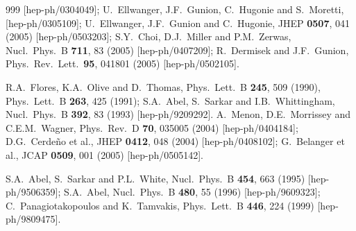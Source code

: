 \documentclass[11pt]{article}
\begin{document}
\begin{thebibliography}{999}
  [hep-ph/0304049];
U.~Ellwanger, J.F.~Gunion, C.~Hugonie and S.~Moretti,
  [hep-ph/0305109];
U.~Ellwanger, J.F.~Gunion and C.~Hugonie,
  JHEP {\bf 0507}, 041 (2005)
  [hep-ph/0503203];
S.Y.~Choi, D.J.~Miller and P.M.~Zerwas,
  Nucl.\ Phys.\ B {\bf 711}, 83 (2005)
  [hep-ph/0407209];
R.~Dermisek and J.F.~Gunion,
  Phys.\ Rev.\ Lett.\  {\bf 95}, 041801 (2005)
  [hep-ph/0502105].

R.A.~Flores, K.A.~Olive and D.~Thomas,
  Phys.\ Lett.\ B {\bf 245}, 509 (1990),
  Phys.\ Lett.\ B {\bf 263}, 425 (1991);
S.A.~Abel, S.~Sarkar and I.B.~Whittingham, 
  Nucl.\ Phys.\ B {\bf 392}, 83 (1993)
  [hep-ph/9209292].
A.~Menon, D.E.~Morrissey and C.E.M.~Wagner,
  Phys.\ Rev.\ D {\bf 70}, 035005 (2004)
  [hep-ph/0404184];
D.G.~Cerde\~no et al.,
  JHEP {\bf 0412}, 048 (2004)
  [hep-ph/0408102];
G.~Belanger et al., 
  JCAP {\bf 0509}, 001 (2005)
  [hep-ph/0505142].

S.A.~Abel, S.~Sarkar and P.L.~White,
  Nucl.\ Phys.\ B {\bf 454}, 663 (1995)
  [hep-ph/9506359];
S.A.~Abel,
  Nucl.\ Phys.\ B {\bf 480}, 55 (1996)
  [hep-ph/9609323];
C.~Panagiotakopoulos and K.~Tamvakis,
  Phys.\ Lett.\ B {\bf 446}, 224 (1999)
  [hep-ph/9809475].
    

\end{thebibliography}
\end{document}
